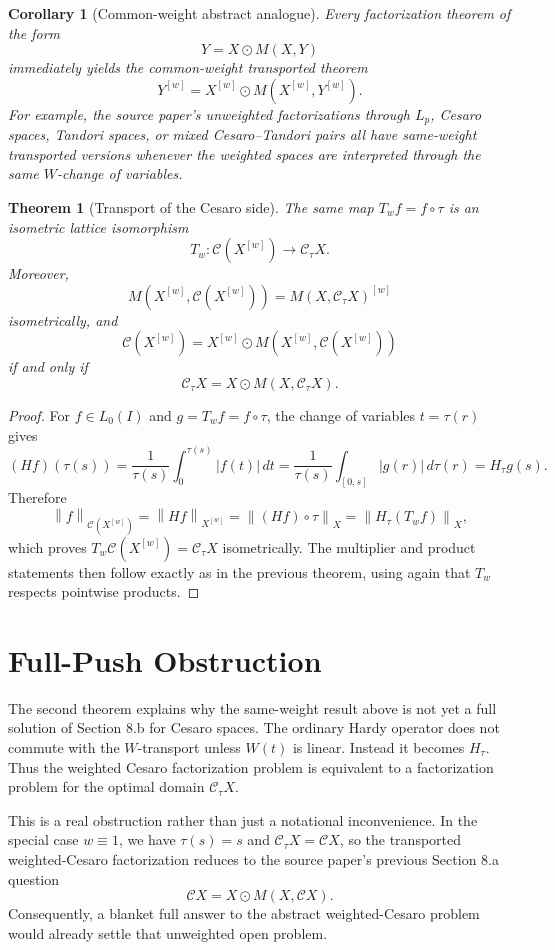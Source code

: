 \documentclass[11pt]{article}
\newtheorem{theorem}{Theorem}
\newtheorem{corollary}{Corollary}
\newcommand{\norm}[1]{\left\lVert #1 \right\rVert}
\newcommand{\odotprod}{\odot}
\newcommand{\C}{\mathcal{C}}
\begin{document}
\begin{corollary}[Common-weight abstract analogue]
Every factorization theorem of the form
\[
  Y = X\odotprod M(X,Y)
\]
immediately yields the common-weight transported theorem
\[
  Y^{[w]} = X^{[w]}\odotprod M(X^{[w]},Y^{[w]}).
\]
For example, the source paper's unweighted factorizations through \(L_p\),
Cesaro spaces, Tandori spaces, or mixed Cesaro--Tandori pairs all have
same-weight transported versions whenever the weighted spaces are interpreted
through the same \(W\)-change of variables.
\end{corollary}

\begin{theorem}[Transport of the Cesaro side]
The same map \(T_w f=f\circ\tau\) is an isometric lattice isomorphism
\[
  T_w:\C(X^{[w]})\longrightarrow \C_\tau X.
\]
Moreover,
\[
  M(X^{[w]},\C(X^{[w]})) = M(X,\C_\tau X)^{[w]}
\]
isometrically, and
\[
  \C(X^{[w]})=X^{[w]}\odotprod M(X^{[w]},\C(X^{[w]}))
\]
if and only if
\[
  \C_\tau X = X\odotprod M(X,\C_\tau X).
\]
\end{theorem}

\begin{proof}
For \(f\in L_0(I)\) and \(g=T_wf=f\circ\tau\), the change of variables
\(t=\tau(r)\) gives
\[
  (Hf)(\tau(s))
  = \frac{1}{\tau(s)}\int_0^{\tau(s)} |f(t)|\,dt
  = \frac{1}{\tau(s)}\int_{[0,s]} |g(r)|\,d\tau(r)
  = H_\tau g(s).
\]
Therefore
\[
  \norm{f}_{\C(X^{[w]})}
  = \norm{Hf}_{X^{[w]}}
  = \norm{(Hf)\circ\tau}_X
  = \norm{H_\tau(T_wf)}_X,
\]
which proves \(T_w\C(X^{[w]})=\C_\tau X\) isometrically.  The multiplier and
product statements then follow exactly as in the previous theorem, using again
that \(T_w\) respects pointwise products.
\end{proof}

\section*{Full-Push Obstruction}

The second theorem explains why the same-weight result above is not yet a full
solution of Section 8.b for Cesaro spaces.  The ordinary Hardy operator does
not commute with the \(W\)-transport unless \(W(t)\) is linear.  Instead it
becomes \(H_\tau\).  Thus the weighted Cesaro factorization problem is
equivalent to a factorization problem for the optimal domain \(\C_\tau X\).

This is a real obstruction rather than just a notational inconvenience.  In the
special case \(w\equiv1\), we have \(\tau(s)=s\) and \(\C_\tau X=\C X\), so the
transported weighted-Cesaro factorization reduces to the source paper's
previous Section 8.a question
\[
  \C X = X\odotprod M(X,\C X).
\]
Consequently, a blanket full answer to the abstract weighted-Cesaro problem
would already settle that unweighted open problem.
\end{document}
